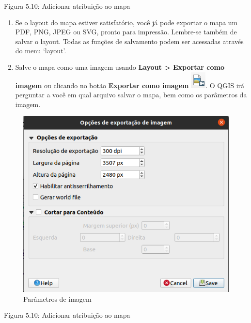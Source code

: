 \documentclass[
]{krantz}
\begin{document}
Figura 5.10: Adicionar atribuição ao mapa

\begin{enumerate}
\def\labelenumi{\arabic{enumi}.}
\setcounter{enumi}{2}
\item
  Se o layout do mapa estiver satisfatório, você já pode exportar o mapa um PDF, PNG, JPEG ou SVG, pronto para impressão. Lembre-se também de salvar o layout. Todas as funções de salvamento podem ser acessadas através do menu `layout'.
\item
  Salve o mapa como uma imagem usando \textbf{Layout \textgreater{} Exportar como imagem} ou clicando no botão \textbf{Exportar como imagem} \includegraphics{media/modulo5/export-image-btn.png}. O QGIS irá perguntar a você em qual arquivo salvar o mapa, bem como os parâmetros da imagem.
\end{enumerate}

\begin{figure}
\centering
\includegraphics{media/modulo5/img-parameters.png}
\caption{Parâmetros de imagem}
\end{figure}

Figura 5.10: Adicionar atribuição ao mapa
\end{document}
